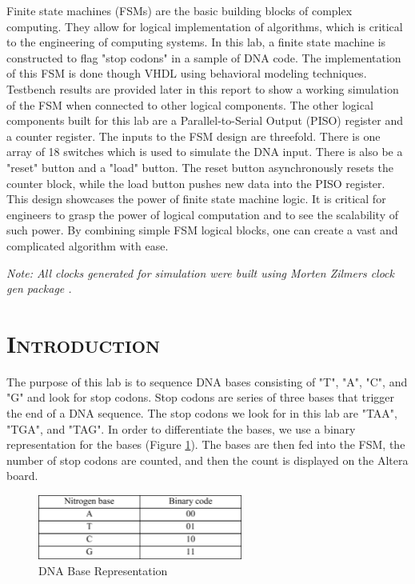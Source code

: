 \documentclass[11pt]{report}
\begin{document}
\begin{spacing}{1.5}
Finite state machines (FSMs) are the basic building blocks of complex computing.  They allow for logical implementation of algorithms, which is critical to the engineering of computing systems.  In this lab, a finite state machine is constructed to flag "stop codons" in a sample of DNA code.  The implementation of this FSM is done though VHDL using behavioral modeling techniques.  Testbench results are provided later in this report to show a working simulation of the FSM when connected to other logical components.  The other logical components built for this lab are a Parallel-to-Serial Output (PISO) register and a counter register.  The inputs to the FSM design are threefold.  There is one array of 18 switches which is used to simulate the DNA input.  There is also be a "reset" button and a "load" button.  The reset button asynchronously resets the counter block, while the load button pushes new data into the PISO register. This design showcases the power of finite state machine logic.  It is critical for engineers to grasp the power of logical computation and to see the scalability of such power.  By combining simple FSM logical blocks, one can create a vast and complicated algorithm with ease.

\vspace{3.5in}

\textit{Note: All clocks generated for simulation were built using Morten Zilmers clock gen package \cite{Synth}.}

\thispagestyle{empty} %
\clearpage
\setcounter{page}{1}

\section*{\scshape Introduction} %
\label{cha:introduction}

The purpose of this lab is to sequence DNA bases consisting of "T", "A", "C", and "G" and look for stop codons.  Stop codons are series of three bases that trigger the end of a DNA sequence.  The stop codons we look for in this lab are "TAA", "TGA", and "TAG".  In order to differentiate the bases, we use a binary representation for the bases (Figure \ref{fig:bases}).  The bases are then fed into the FSM, the number of stop codons are counted, and then the count is displayed on the Altera board.

\vspace{15px}
\begin{figure}[H]
    \centering
    \includegraphics[width=0.6\textwidth,keepaspectratio]{bases.png}
    \caption{DNA Base Representation}
    \label{fig:bases}
\end{figure}


\end{spacing}
\end{document}
